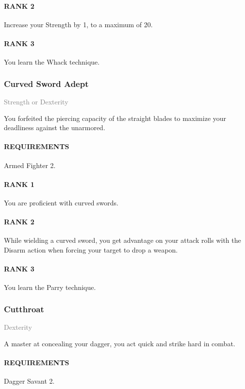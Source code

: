 \paragraph{RANK 2} Increase your Strength by 1, to a maximum of 20.
\paragraph{RANK 3} You learn the Whack technique.

\subsubsection{Curved Sword Adept} \label{feat::curvedswordadept}
\small{\textcolor{gray}{Strength or Dexterity}}

\normalsize
You forfeited the piercing capacity of the straight blades to maximize your deadliness against the unarmored.
\paragraph{REQUIREMENTS} Armed Fighter 2.
\paragraph{RANK 1} You are proficient with curved swords.
\paragraph{RANK 2} While wielding a curved sword, you get advantage on your attack rolls with the Disarm action when forcing your target to drop a weapon.
\paragraph{RANK 3} You learn the Parry technique.

\subsubsection{Cutthroat} \label{feat::cutthroat}
\small{\textcolor{gray}{Dexterity}}

\normalsize
A master at concealing your dagger, you act quick and strike hard in combat.
\paragraph{REQUIREMENTS} Dagger Savant 2.
